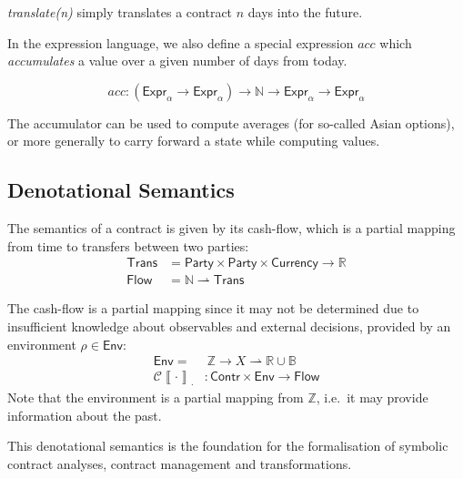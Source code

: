 \documentclass[a4paper,debug,twocolumn]{easychair}
\newcommand{\comm}[3][red]{{\small \color{#1}{$\spadesuit$#2: #3}}}
\newcommand{\jbcomment}[1]{\comm[orange]{jb}{#1}}
\newcommand\type[1]{\mathsf{#1}}
\newcommand\reals{{\mathbb R}}
\newcommand\nats{{\mathbb N}}
\newcommand\ints{{\mathbb Z}}
\newcommand\bools{{\mathbb B}}
\newcommand\pto{\rightharpoonup}
\newcommand\cSem[2]{{\mathcal C}\left\llbracket#1\right\rrbracket_{#2}}
\theoremstyle{plain}
\begin{document}
\emph{translate(n)} simply translates a contract $n$ days into the future.


In the expression language, we also define a special
expression $\mathit{acc}$ which \emph{accumulates} a value over a
given number of days from today.

\vspace*{-2ex}
{\small
\[
\mathit{acc} : (\type{Expr}_\alpha \to \type{Expr}_\alpha) \to \nats \to \type{Expr}_\alpha \to \type{Expr}_\alpha
\]
}
\vspace*{-3ex}

The accumulator can be used to compute averages (for so-called Asian options),
or more generally to carry forward a state while computing values.


\subsection{Denotational Semantics}
\label{sec:semantics}

The semantics of a contract is given by its cash-flow, which is a
partial mapping from time to transfers between two parties:
\begin{align*}
  \type{Trans} &= \type{Party} \times \type{Party} \times
  \type{Currency} \to \reals\\
  \type{Flow} &= \nats \pto \type{Trans}
\end{align*}

The cash-flow is a partial mapping since it may not be determined due
to insufficient knowledge about observables and external decisions,
provided by an environment $\rho\in\type{Env}$:
\begin{align*}
  \type{Env} = &\ \ints \to X \pto  \reals \cup \bools\\
  \cSem{\cdot}{\cdot}&\colon \type{Contr} \times \type{Env} \to
  \type{Flow}
\end{align*}
Note that the environment is a partial mapping from $\ints$, i.e.\ it
may provide information about the past.

This denotational semantics is the foundation for the formalisation of
symbolic contract analyses, contract management and %
transformations.
\end{document}
